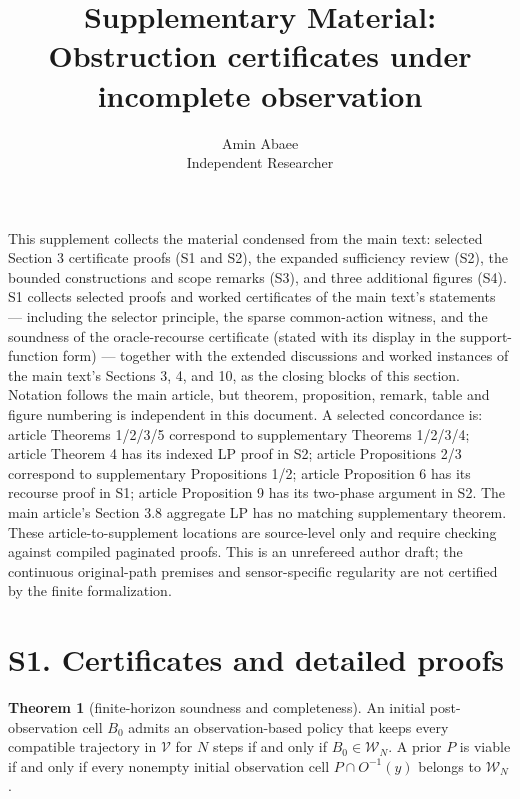 \documentclass[11pt]{article}
\theoremstyle{definition}
\newtheorem{theorem}{Theorem}
\begin{document}
\title{Supplementary Material: Obstruction certificates under incomplete observation}
\author{Amin Abaee\\[0.2em]{\small Independent Researcher}}
\maketitle

This supplement collects the material condensed from the main text: selected Section 3 certificate proofs (S1 and S2), the expanded sufficiency review (S2), the bounded constructions and scope remarks (S3), and three additional figures (S4). S1 collects selected proofs and worked certificates of the main text's statements --- including the selector principle, the sparse common-action witness, and the soundness of the oracle-recourse certificate (stated with its display in the support-function form) --- together with the extended discussions and worked instances of the main text's Sections 3, 4, and 10, as the closing blocks of this section. Notation follows the main article, but theorem, proposition, remark, table and figure numbering is independent in this document. A selected concordance is: article Theorems 1/2/3/5 correspond to supplementary Theorems 1/2/3/4; article Theorem 4 has its indexed LP proof in S2; article Propositions 2/3 correspond to supplementary Propositions 1/2; article Proposition 6 has its recourse proof in S1; article Proposition 9 has its two-phase argument in S2. The main article's Section 3.8 aggregate LP has no matching supplementary theorem. These article-to-supplement locations are source-level only and require checking against compiled paginated proofs. This is an unrefereed author draft; the continuous original-path premises and sensor-specific regularity are not certified by the finite formalization.

\section*{S1. Certificates and detailed proofs}

\begin{theorem}[finite-horizon soundness and completeness]\label{thm:finite-horizon}
An initial post-observation cell \(B_0\) admits an observation-based
policy that keeps every compatible trajectory in \(\mathcal V\) for
\(N\) steps if and only if \(B_0\in\mathcal W_N\). A prior
\(P\) is viable if and only if every nonempty initial observation cell
\(P\cap O^{-1}(y)\) belongs to \(\mathcal W_N\).
\end{theorem}
\end{document}
